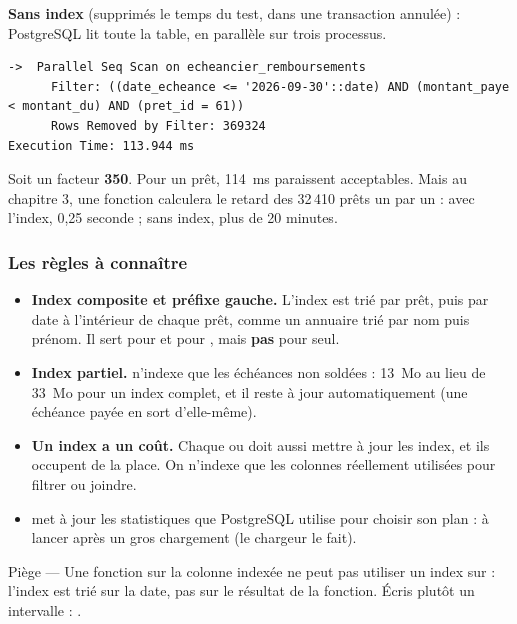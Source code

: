 \textbf{Sans index} (supprimés le temps du test, dans une transaction annulée) : PostgreSQL lit toute
la table, en parallèle sur trois processus.
\begin{lstlisting}[style=sortie]
->  Parallel Seq Scan on echeancier_remboursements
      Filter: ((date_echeance <= '2026-09-30'::date) AND (montant_paye < montant_du) AND (pret_id = 61))
      Rows Removed by Filter: 369324
Execution Time: 113.944 ms
\end{lstlisting}

Soit un facteur \textbf{350}. Pour un prêt, 114~ms paraissent acceptables. Mais au chapitre 3, une
fonction calculera le retard des 32\,410 prêts un par un : avec l'index, 0,25 seconde ; sans index,
plus de 20 minutes.

\subsubsection{Les règles à connaître}

\begin{itemize}
\item \textbf{Index composite et préfixe gauche.} L'index  est trié par
prêt, puis par date à l'intérieur de chaque prêt, comme un annuaire trié par nom puis prénom. Il sert
pour  et pour , mais
\textbf{pas} pour  seul.
\item \textbf{Index partiel.}  n'indexe que les échéances non
soldées : 13~Mo au lieu de 33~Mo pour un index complet, et il reste à jour automatiquement (une échéance
payée en sort d'elle-même).
\item \textbf{Un index a un coût.} Chaque  ou  doit aussi mettre à jour les
index, et ils occupent de la place. On n'indexe que les colonnes réellement utilisées pour filtrer ou
joindre.
\item \textbf{} met à jour les statistiques que PostgreSQL utilise pour choisir son plan :
à lancer après un gros chargement (le chargeur le fait).
\end{itemize}

\begin{piege}{Piège --- Une fonction sur la colonne indexée}
 ne peut pas utiliser un index sur
 : l'index est trié sur la date, pas sur le résultat de la fonction. Écris plutôt
un intervalle : .
\end{piege}

